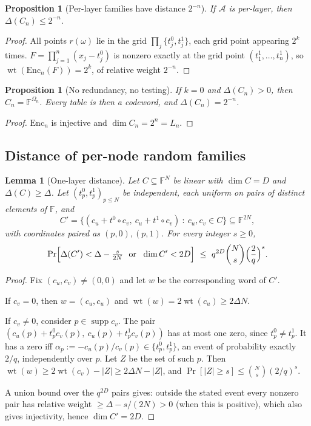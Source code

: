 \documentclass[11pt]{article}
\newtheorem{lemma}[theorem]{Lemma}
\newtheorem{proposition}[theorem]{Proposition}
\theoremstyle{definition}
\newcommand{\F}{\mathbb{F}}
\newcommand{\Enc}{\mathrm{Enc}}
\begin{document}
\begin{proposition}[Per-layer families have distance $2^{-n}$]\label{prop:perlayer}
If $\mathcal{A}$ is per-layer, then $\Delta(C_n)\le 2^{-n}$.
\end{proposition}
\begin{proof}
All points $r(\omega)$ lie in the grid $\prod_j\{t_j^0,t_j^1\}$, each grid point appearing $2^k$
times. $F=\prod_{j=1}^n(x_j-t_j^0)$ is nonzero exactly at the grid point
$(t_1^1,\dots,t_n^1)$, so $\operatorname{wt}(\Enc_n(F))=2^k$, of relative weight $2^{-n}$.
\end{proof}

\begin{proposition}[No redundancy, no testing]\label{prop:rate1}
If $k=0$ and $\Delta(C_n)>0$, then $C_n=\F^{\Omega_n}$. Every table is then a codeword, and
$\Delta(C_n)=2^{-n}$.
\end{proposition}
\begin{proof}
$\Enc_n$ is injective and $\dim C_n=2^n=L_n$.
\end{proof}

\subsection{Distance of per-node random families}

\begin{lemma}[One-layer distance]\label{lem:layer}
Let $C\subseteq\F^{N}$ be linear with $\dim C=D$ and $\Delta(C)\ge\Delta$. Let
$(t^0_p,t^1_p)_{p\le N}$ be independent, each uniform on pairs of distinct elements of $\F$, and
\[
C'=\bigl\{(c_u+t^0\circ c_v,\ c_u+t^1\circ c_v)\ :\ c_u,c_v\in C\bigr\}\subseteq\F^{2N},
\]
with coordinates paired as $(p,0),(p,1)$. For every integer $s\ge0$,
\[
\Pr\Bigl[\Delta(C')<\Delta-\tfrac{s}{2N}\ \text{ or }\ \dim C'<2D\Bigr]\ \le\ q^{2D}\binom{N}{s}\Bigl(\frac{2}{q}\Bigr)^{s}.
\]
\end{lemma}
\begin{proof}
Fix $(c_u,c_v)\neq(0,0)$ and let $w$ be the corresponding word of $C'$.

If $c_v=0$, then $w=(c_u,c_u)$ and $\operatorname{wt}(w)=2\operatorname{wt}(c_u)\ge2\Delta N$.

If $c_v\neq0$, consider $p\in\operatorname{supp}c_v$. The pair
$(c_u(p)+t^0_pc_v(p),\ c_u(p)+t^1_pc_v(p))$ has at most one zero, since $t^0_p\neq t^1_p$.
It has a zero iff $\alpha_p:=-c_u(p)/c_v(p)\in\{t^0_p,t^1_p\}$, an event of probability exactly
$2/q$, independently over $p$. Let $Z$ be the set of such $p$. Then
$\operatorname{wt}(w)\ge 2\operatorname{wt}(c_v)-|Z|\ge2\Delta N-|Z|$, and
$\Pr[|Z|\ge s]\le\binom{N}{s}(2/q)^s$.

A union bound over the $q^{2D}$ pairs gives: outside the stated event every nonzero pair has
relative weight $\ge\Delta-s/(2N)>0$ (when this is positive), which also gives injectivity, hence $\dim C'=2D$.
\end{proof}
\end{document}

